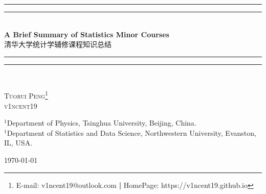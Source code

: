 \documentclass[x11names,11pt,a4paper,openany]{book}
\begin{document}
\begin{titlepage}
  \thispagestyle{TitlePage}
  \begin{center}
      \vspace*{4cm}
{      \settowidth{\unitlength}{\Huge A Brief Summary of Statistics Minor Courses}
      \rule{\unitlength}{1.6pt}\vspace*{-\baselineskip}\vspace*{2pt}
      \rule{\unitlength}{0.4pt}\\[\baselineskip]
      \huge\textbf{A Brief Summary of Statistics Minor Courses}\\\LARGE\heiti 清华大学统计学辅修课程知识总结\\[0.3\baselineskip]
      \rule{\unitlength}{0.4pt}\vspace*{-\baselineskip}\vspace{3.2pt}
      \rule{\unitlength}{1.6pt}\\[\baselineskip]}
          
      \vspace{1.5cm}
{      \large\scshape Tuorui Peng\footnote{E-mail: {v1ncent19@outlook.com} \textbf{|} HomePage: {https://v1ncent19.github.io}}\\
      \ttfamily\normalsize v1ncent19}

      \vspace{1.5cm}
{      \normalshape\normalfont\small
       $ ^1 $Department of Physics, Tsinghua University, Beijing, China.\\
       $ ^1 $Department of Statistics and Data Science, Northwestern University, Evanston, IL, USA.}
          

      \vspace{1.5cm}
      \today
          
  \end{center}
\end{titlepage}




\pagestyle{preContent}
{}
\tableofcontents
\newpage




\providecommand{\cmark}[2][]{%
  \begin{pgfonlayer}{marx}
    \node [nmark] at (c#2#1) {#2};
  \end{pgfonlayer}{marx}
  } 
\providecommand{\cmark}[2][]{\relax} 
\end{document}

